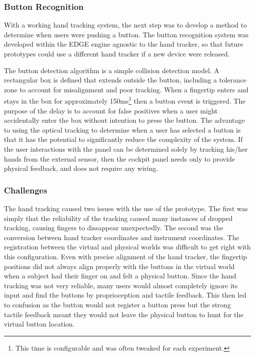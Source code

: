\subsubsection{Button Recognition}

With a working hand tracking system, the next step was to develop a method to determine when users were pushing a button.
The button recognition system was developed within the EDGE engine agnostic to the hand tracker, so that future prototypes could use a different hand tracker if a new device were released.

The button detection algorithm is a simple collision detection model.
A rectangular box is defined that extends outside the button, including a tolerance zone to account for misalignment and poor tracking.
When a fingertip enters and stays in the box for approximately 150ms\footnote{This time is configurable and was often tweaked for each experiment.} then a button event is triggered.
The purpose of the delay is to account for false positives when a user might accidentally enter the box without intention to press the button.
The advantage to using the optical tracking to determine when a user has selected a button is that it has the potential to significantly reduce the complexity of the system.
If the user interactions with the panel can be determined solely by tracking his/her hands from the external sensor, then the cockpit panel needs only to provide physical feedback, and does not require any wiring.

\subsubsection{Challenges}

The hand tracking caused two issues with the use of the prototype.
The first was simply that the reliability of the tracking caused many instances of dropped tracking, causing fingers to dissappear unexpectedly.
The second was the conversion between hand tracker coordinates and instrument coordinates.
The registration between the virtual and physical worlds was difficult to get right with this configuration.
Even with precise alignment of the hand tracker, the fingertip positions did not always align properly with the buttons in the virtual world when a subject had their finger on and felt a physical button.
Since the hand tracking was not very reliable, many users would almost completely ignore its input and find the buttons by proprioception and tactile feedback.
This then led to confusion as the button would not register a button press but the strong tactile feedback meant they would not leave the physical button to hunt for the virtual button location.

